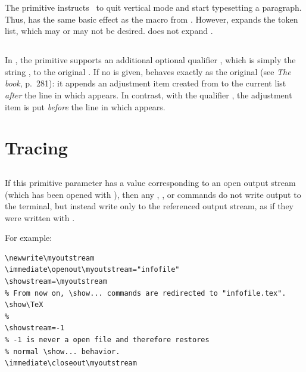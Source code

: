 \documentclass{pdftexmanual}
\begin{document}
The primitive instructs \PDFTEX\ to quit vertical mode and start
typesetting a paragraph. Thus,  has the same basic effect
as the  macro from . However,
 expands the  token list, which may or may
not be desired.  does not expand .

\subsection{}

In \PDFTEX, the  primitive supports an additional optional
qualifier , which is simply the string ,
to the original \TEX. If no  is given,  behaves
exactly as the original (see {\em The \TEX book}, p.~281): it appends an
adjustment item created from  to the
current list {\em after} the line in which  appears. In
contrast, with the qualifier , the adjustment item is put {\em
before} the line in which  appears.

\section{Tracing}

\subsection{}

If this primitive parameter has a value corresponding to an open output
stream (which has been opened with ), then any ,
,  or  commands do not write
output to the terminal, but instead write only to the referenced output
stream, as if they were written with .

For example:
\begin{verbatim}
\newwrite\myoutstream
\immediate\openout\myoutstream="infofile"
\showstream=\myoutstream
% From now on, \show... commands are redirected to "infofile.tex".
\show\TeX
%
\showstream=-1
% -1 is never a open file and therefore restores
% normal \show... behavior.
\immediate\closeout\myoutstream
\end{verbatim}
\end{document}

